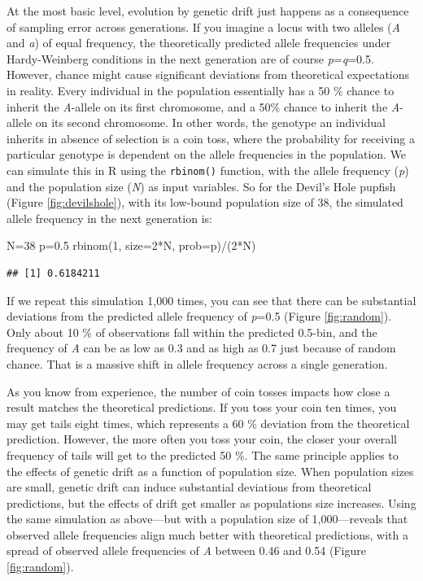 \documentclass[
]{book}
\newenvironment{Shaded}{\begin{snugshade}}{\end{snugshade}}
\newcommand{\AttributeTok}[1]{\textcolor[rgb]{0.77,0.63,0.00}{#1}}
\newcommand{\DecValTok}[1]{\textcolor[rgb]{0.00,0.00,0.81}{#1}}
\newcommand{\FloatTok}[1]{\textcolor[rgb]{0.00,0.00,0.81}{#1}}
\newcommand{\FunctionTok}[1]{\textcolor[rgb]{0.00,0.00,0.00}{#1}}
\newcommand{\NormalTok}[1]{#1}
\newcommand{\OtherTok}[1]{\textcolor[rgb]{0.56,0.35,0.01}{#1}}
\newcommand{\SpecialCharTok}[1]{\textcolor[rgb]{0.00,0.00,0.00}{#1}}
\begin{document}
At the most basic level, evolution by genetic drift just happens as a consequence of sampling error across generations. If you imagine a locus with two alleles (\emph{A} and \emph{a}) of equal frequency, the theoretically predicted allele frequencies under Hardy-Weinberg conditions in the next generation are of course \emph{p}=\emph{q}=0.5. However, chance might cause significant deviations from theoretical expectations in reality. Every individual in the population essentially has a 50 \% chance to inherit the \emph{A}-allele on its first chromosome, and a 50\% chance to inherit the \emph{A}-allele on its second chromosome. In other words, the genotype an individual inherits in absence of selection is a coin toss, where the probability for receiving a particular genotype is dependent on the allele frequencies in the population. We can simulate this in R using the \texttt{rbinom()} function, with the allele frequency (\emph{p}) and the population size (\emph{N}) as input variables. So for the Devil's Hole pupfish (Figure \ref{fig:devilshole}), with its low-bound population size of 38, the simulated allele frequency in the next generation is:

\begin{Shaded}
\begin{Highlighting}[]
\NormalTok{N}\OtherTok{=}\DecValTok{38}
\NormalTok{p}\OtherTok{=}\FloatTok{0.5}
\FunctionTok{rbinom}\NormalTok{(}\DecValTok{1}\NormalTok{, }\AttributeTok{size=}\DecValTok{2}\SpecialCharTok{*}\NormalTok{N, }\AttributeTok{prob=}\NormalTok{p)}\SpecialCharTok{/}\NormalTok{(}\DecValTok{2}\SpecialCharTok{*}\NormalTok{N)}
\end{Highlighting}
\end{Shaded}

\begin{verbatim}
## [1] 0.6184211
\end{verbatim}

If we repeat this simulation 1,000 times, you can see that there can be substantial deviations from the predicted allele frequency of \emph{p}=0.5 (Figure \ref{fig:random}). Only about 10 \% of observations fall within the predicted 0.5-bin, and the frequency of \emph{A} can be as low as 0.3 and as high as 0.7 just because of random chance. That is a massive shift in allele frequency across a single generation.

As you know from experience, the number of coin tosses impacts how close a result matches the theoretical predictions. If you toss your coin ten times, you may get tails eight times, which represents a 60 \% deviation from the theoretical prediction. However, the more often you toss your coin, the closer your overall frequency of tails will get to the predicted 50 \%. The same principle applies to the effects of genetic drift as a function of population size. When population sizes are small, genetic drift can induce substantial deviations from theoretical predictions, but the effects of drift get smaller as populations size increases. Using the same simulation as above---but with a population size of 1,000---reveals that observed allele frequencies align much better with theoretical predictions, with a spread of observed allele frequencies of \emph{A} between 0.46 and 0.54 (Figure \ref{fig:random}).
\end{document}
